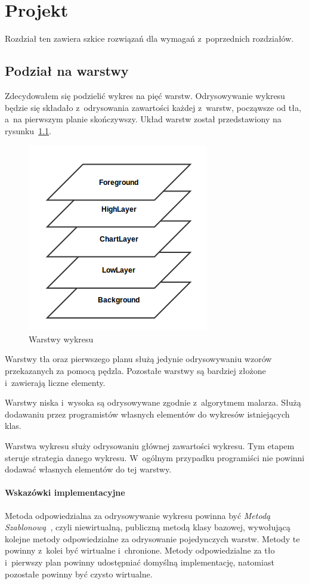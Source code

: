 \chapter{Projekt}
Rozdział ten zawiera szkice rozwiązań dla wymagań z~poprzednich rozdziałów.

\section{Podział na warstwy}
Zdecydowałem się podzielić wykres na pięć warstw. Odrysowywanie wykresu będzie się składało z~odrysowania zawartości każdej z~warstw, począwsze od tła, a~na pierwszym planie skończywszy.
Układ warstw został przedstawiony na rysunku~\ref{rys:warstwy}.

\begin{figure}
\centering
\caption{Warstwy wykresu}\label{rys:warstwy}
\includegraphics{img/warstwy.png}
\end{figure}

Warstwy tła oraz pierwszego planu służą jedynie odrysowywaniu wzorów przekazanych za pomocą pędzla. Pozostałe warstwy są bardziej złożone i~zawierają liczne elementy.

Warstwy niska i~wysoka są odrysowywane zgodnie z~algorytmem malarza. Służą dodawaniu przez programistów własnych elementów do wykresów istniejących klas.

Warstwa wykresu służy odrysowaniu głównej zawartości wykresu. Tym etapem steruje strategia danego wykresu. W~ogólnym przypadku programiści nie powinni dodawać własnych elementów do tej warstwy.

\subsubsection{Wskazówki implementacyjne}
Metoda odpowiedzialna za odrysowywanie wykresu powinna być \textit{Metodą Szablonową}~\cite[264-268]{Patterns}, czyli niewirtualną, publiczną metodą klasy bazowej, wywołującą kolejne metody odpowiedzialne za odrysowanie pojedynczych warstw. Metody te powinny z~kolei być wirtualne i~chronione.
Metody odpowiedzialne za tło i~pierwszy plan powinny udostępniać domyślną implementację, natomiast pozostałe powinny być czysto wirtualne.

